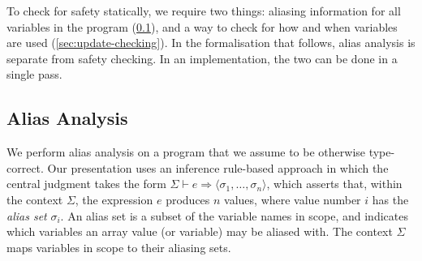 To check for safety statically, we require two things: aliasing
information for all variables in the program
(\cref{sec:alias-analysis}), and a way to check for how and when
variables are used (\cref{sec:update-checking}).  In the formalisation
that follows, alias analysis is separate from safety checking.  In an
implementation, the two can be done in a single pass.

\subsection{Alias Analysis}
\label{sec:alias-analysis}

\newcommand{\expAliases}[3]{#1 \vdash #2 \Rightarrow #3}
\newcommand{\aliases}[1]{\textrm{aliases}(#1)}
\newcommand{\seqOccurences}[3]{#1 \gg #2 : #3}

We perform alias analysis on a program that we assume to be otherwise
type-correct.  Our presentation uses an inference rule-based approach
in which the central judgment takes the form %
$\expAliases{\Sigma}{e}{\langle \sigma_{1}, \ldots, \sigma_{n}
  \rangle}$, which asserts that, within the context $\Sigma$, the
expression $e$ produces $n$ values, where value number $i$ has the
\textit{alias set} $\sigma_{i}$.  An alias set is a subset of the
variable names in scope, and indicates which variables an array value
(or variable) may be aliased with.
The context $\Sigma$ maps variables in scope
to their aliasing sets.

